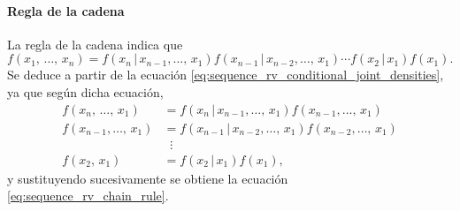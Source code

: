 \documentclass[a4paper]{report}
\begin{document}
\paragraph{Regla de la cadena} La regla de la cadena indica que
\begin{equation}\label{eq:sequence_rv_chain_rule}
 f(x_1,\,\dots,\,x_n)=f(x_n\,|\,x_{n-1},\dots,\,x_1)f(x_{n-1}\,|\,x_{n-2},\dots,\,x_1)\cdots f(x_2\,|\,x_1)f(x_1).
\end{equation}
Se deduce a partir de la ecuación \ref{eq:sequence_rv_conditional_joint_densities}, ya que según dicha ecuación,
\begin{align*}
 f(x_n,\,\dots,\,x_1)&=f(x_n\,|\,x_{n-1},\dots,\,x_1)f(x_{n-1},\dots,\,x_1)\\
 f(x_{n-1},\dots,\,x_1)&=f(x_{n-1}\,|\,x_{n-2},\dots,\,x_1)f(x_{n-2},\dots,\,x_1)\\
 & \;\;\vdots \\
 f(x_2,\,x_1)&=f(x_2\,|\,x_1)f(x_1),
\end{align*}
y sustituyendo sucesivamente se obtiene la ecuación \ref{eq:sequence_rv_chain_rule}.
\end{document}
